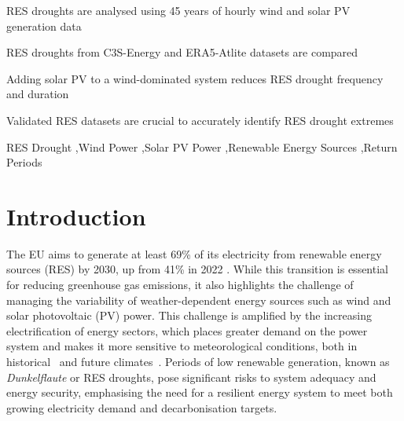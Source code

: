 \documentclass[preprint, 12pt]{elsarticle}
\begin{document}
\begin{frontmatter}
\begin{highlights}
\item RES droughts are analysed using 45 years of hourly wind and solar PV generation data

\item RES droughts from C3S-Energy and ERA5-Atlite datasets are compared

\item Adding solar PV to a wind-dominated system reduces RES drought frequency and duration

\item Validated RES datasets are crucial to accurately identify RES drought extremes

\end{highlights}

\begin{keyword}
RES Drought \sep Wind Power \sep Solar PV Power \sep Renewable Energy Sources \sep Return Periods

\end{keyword}

\end{frontmatter}

\linenumbers

\section{Introduction}
\label{sec:intro}

The EU aims to generate at least 69\% of its electricity from renewable energy sources (RES) by 2030, up from 41\% in 2022 \citep{eurostat2023share}. While this transition is essential for reducing greenhouse gas emissions, it also highlights the challenge of managing the variability of weather-dependent energy sources such as wind and solar photovoltaic (PV) power. This challenge is amplified by the increasing electrification of energy sectors, which places greater demand on the power system and makes it more sensitive to meteorological conditions, both in historical~\citep{bloomfield2016} and future climates~\citep{bloomfield2021}. Periods of low renewable generation, known as \textit{Dunkelflaute} or RES droughts, pose significant risks to system adequacy and energy security, emphasising the need for a resilient energy system to meet both growing electricity demand and decarbonisation targets.
\end{document}
